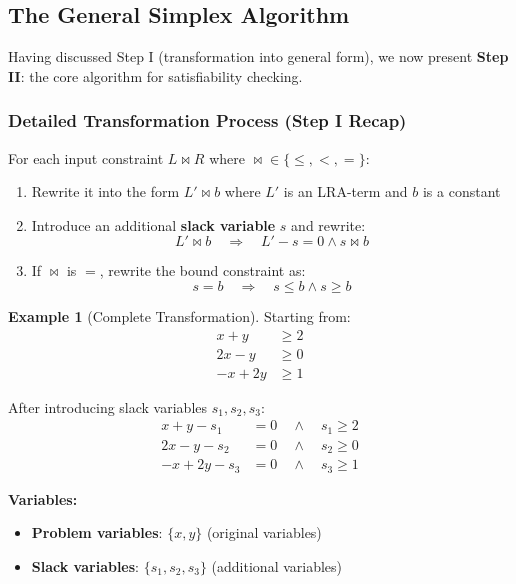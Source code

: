 \documentclass[11pt,a4paper]{article}
\theoremstyle{definition}
\newtheorem{example}{Example}[section]
\theoremstyle{plain}
\theoremstyle{remark}
\begin{document}
\newpage 

\subsection{The General Simplex Algorithm}

Having discussed Step I (transformation into general form), we now present \textbf{Step II}: the core algorithm for satisfiability checking.

\subsubsection{Detailed Transformation Process (Step I Recap)}

For each input constraint $L \bowtie R$ where $\bowtie \in \{\leq, <, =\}$:

\begin{enumerate}
    \item Rewrite it into the form $L' \bowtie b$ where $L'$ is an LRA-term and $b$ is a constant
    
    \item Introduce an additional \textbf{slack variable} $s$ and rewrite:
    \[
    L' \bowtie b \quad \Rightarrow \quad L' - s = 0 \land s \bowtie b
    \]
    
    \item If $\bowtie$ is $=$, rewrite the bound constraint as:
    \[
    s = b \quad \Rightarrow \quad s \leq b \land s \geq b
    \]
\end{enumerate}

\begin{example}[Complete Transformation]
Starting from:
\begin{align*}
x + y &\geq 2 \\
2x - y &\geq 0 \\
-x + 2y &\geq 1
\end{align*}

After introducing slack variables $s_1, s_2, s_3$:
\begin{align*}
x + y - s_1 &= 0 \quad \land \quad s_1 \geq 2 \\
2x - y - s_2 &= 0 \quad \land \quad s_2 \geq 0 \\
-x + 2y - s_3 &= 0 \quad \land \quad s_3 \geq 1
\end{align*}

\textbf{Variables:}
\begin{itemize}
    \item \textbf{Problem variables}: $\{x, y\}$ (original variables)
    \item \textbf{Slack variables}: $\{s_1, s_2, s_3\}$ (additional variables)
\end{itemize}
\end{example}
\end{document}

